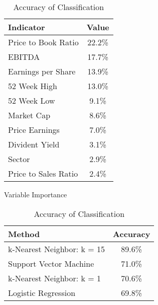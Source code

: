 \documentclass[12pt]{article}
\begin{document}
\begin{table}[h]
\begin{minipage}{.5\linewidth}
		\end{minipage}%
		\begin{minipage}{.5\linewidth}
			\centering
			
			\begin{tabular}{| l | c |}
				\hline
				\textbf{Indicator}
				& \textbf{Value} \\
				\hline
				Price to Book Ratio  & 22.2\%         \\
				\hline
				EBITDA               & 17.7\%         \\
				\hline
				Earnings per Share   & 13.9\%         \\ 		\hline
				52 Week High         & 13.0\%         \\ 		\hline
				52 Week Low          & 9.1\%          \\ 		\hline
				Market Cap           & 8.6\%          \\		\hline
				Price Earnings       & 7.0\%          \\ 		\hline
				Divident Yield       & 3.1\%          \\ 		\hline
				Sector               & 2.9\%          \\ 		\hline
				Price to Sales Ratio & 2.4\%          \\	\hline
			\end{tabular}
			\caption{Variable Importance }
			\vspace{1.5ex}
			\label{svm var imp}
			\centering
			\begin{tabular}{| l | c |}
				\hline
				\textbf{Method}            & \textbf{Accuracy} \\
				\hline
				k-Nearest Neighbor: k = 15 & 89.6\%            \\
				\hline
				
				Support Vector Machine     & 71.0\%            \\
				\hline
				k-Nearest Neighbor: k = 1  & 70.6\%            \\
				\hline
				Logistic Regression        & 69.8\%            \\
				\hline
			\end{tabular}
			\caption{Accuracy of Classification} 
			\label{method accuracy}
		\end{minipage} 
	\end{table}
	\vspace{-3.5ex}
\end{document}
